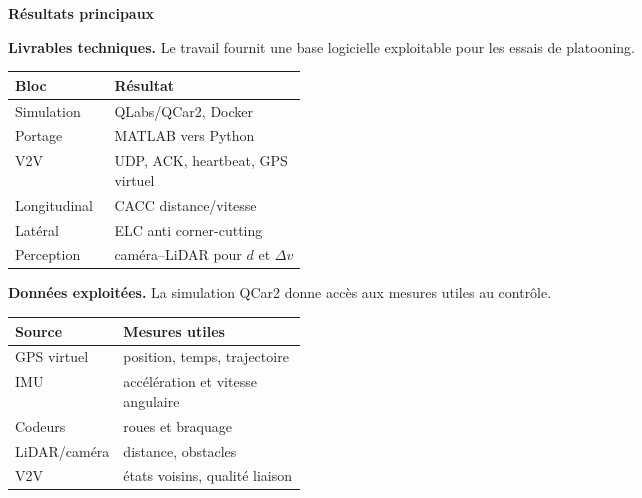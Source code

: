 \documentclass[10pt,a4paper]{article}
\newcommand{\sectiontitle}[1]{%
  \vspace{2.5mm}
  {\large\bfseries\color{accent} #1}\par
  \vspace{1mm}
}
\begin{document}
\sectiontitle{R\'esultats principaux}
\begin{minipage}[t]{0.47\textwidth}
\textbf{Livrables techniques.} Le travail fournit une base logicielle exploitable pour les essais de platooning.

\vspace{1mm}
\footnotesize
\begin{tabularx}{\linewidth}{|>{\raggedright\arraybackslash}p{0.34\linewidth}|>{\raggedright\arraybackslash}X|}
\hline
\textbf{Bloc} & \textbf{R\'esultat}\\
\hline
Simulation & QLabs/QCar2, Docker\\
Portage & MATLAB vers Python\\
V2V & UDP, ACK, heartbeat, GPS virtuel\\
Longitudinal & CACC distance/vitesse\\
Lat\'eral & ELC anti corner-cutting\\
Perception & cam\'era--LiDAR pour $d$ et $\Delta v$\\
\hline
\end{tabularx}
\end{minipage}
\hfill
\begin{minipage}[t]{0.49\textwidth}
\textbf{Donn\'ees exploit\'ees.} La simulation QCar2 donne acc\`es aux mesures utiles au contr\^ole.

\vspace{1mm}
\footnotesize
\begin{tabularx}{\linewidth}{|>{\raggedright\arraybackslash}p{0.34\linewidth}|>{\raggedright\arraybackslash}X|}
\hline
\textbf{Source} & \textbf{Mesures utiles}\\
\hline
GPS virtuel & position, temps, trajectoire\\
IMU & acc\'el\'eration et vitesse angulaire\\
Codeurs & roues et braquage\\
LiDAR/cam\'era & distance, obstacles\\
V2V & \'etats voisins, qualit\'e liaison\\
\hline
\end{tabularx}
\end{minipage}

\vspace{2mm}
\end{document}
